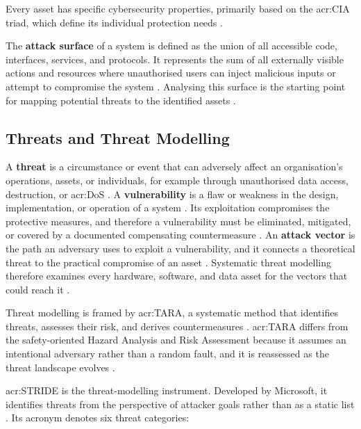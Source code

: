 Every asset has specific cybersecurity properties, primarily based on the \gls{acr:CIA} triad, which define its individual protection needs \cite[p. 5]{Wurm2022}.

The \textbf{attack surface} of a system is defined as the union of all accessible code, interfaces, services, and protocols. It represents the sum of all externally visible actions and resources where unauthorised users can inject malicious inputs or attempt to compromise the system \cite[p. 1]{THEISEN201894} \cite[p. 80]{richier2011security}. Analysing this surface is the starting point for mapping potential threats to the identified assets \cite[p. 80]{richier2011security}.

\subsection{Threats and Threat Modelling} 
\label{subsec:threats_vulnerabilities_attack_vectors}

A \textbf{threat} is a circumstance or event that can adversely affect an organisation's operations, assets, or individuals, for example through unauthorised data access, destruction, or \gls{acr:DoS} \cite[p. 23]{IEC62443-3-3}. A \textbf{vulnerability} is a flaw or weakness in the design, implementation, or operation of a system \cite[p. 12]{prEN50742_2025}. Its exploitation compromises the protective measures, and therefore a vulnerability must be eliminated, mitigated, or covered by a documented compensating countermeasure \cite[p. 9]{prEN50742_2025} \cite[p. 14]{prEN50742_2025}. An \textbf{attack vector} is the path an adversary uses to exploit a vulnerability, and it connects a theoretical threat to the practical compromise of an asset \cite[p. 80]{richier2011security} \cite{IBM_AttackVector}. Systematic threat modelling therefore examines every hardware, software, and data asset for the vectors that could reach it \cite[p. 2, p. 11]{liebl2024analyzingattacksurfacethreats}.

\label{subsec:tara}
Threat modelling is framed by \gls{acr:TARA}, a systematic method that identifies threats, assesses their risk, and derives countermeasures \cite[p. 37]{doCarmo2025}. \gls{acr:TARA} differs from the safety-oriented Hazard Analysis and Risk Assessment because it assumes an intentional adversary rather than a random fault, and it is reassessed as the threat landscape evolves \cite[p. 70]{Wurm2022}. 

\label{subsec:stride}
\gls{acr:STRIDE} is the threat-modelling instrument. Developed by Microsoft, it identifies threats from the perspective of attacker goals rather than as a static list \cite{microsoft_stride_model} \cite[p. 143]{doCarmo2025} \cite{owasp_threat_modeling_process}. Its acronym denotes six threat categories:

